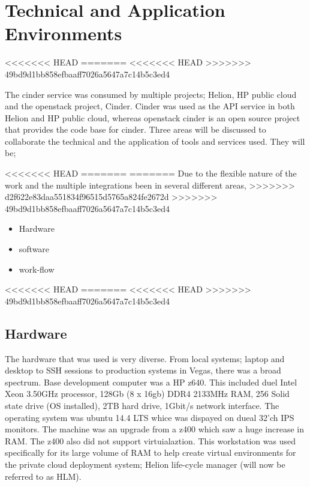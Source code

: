 \documentclass[11pt,a4paper]{report}
\begin{document}
\section{Technical and Application Environments}
<<<<<<< HEAD
=======
<<<<<<< HEAD
>>>>>>> 49bd9d1bb858efbaaff7026a5647a7c14b5c3ed4


The cinder service was consumed by multiple projects; Helion, HP public cloud and the openstack project, Cinder. Cinder was used as the API service in both Helion and HP public cloud, whereas openstack cinder is an open source project that provides the code base for cinder. Three areas will be discussed to collaborate the technical and the application of tools and services used. They will be;

<<<<<<< HEAD
=======
=======
Due to the flexible nature of the work and the multiple integrations  been in several different areas, 
>>>>>>> d2f622e83daa551834f96515d5765a824fe2672d
>>>>>>> 49bd9d1bb858efbaaff7026a5647a7c14b5c3ed4
\begin{itemize}
\item Hardware
\item software
\item work-flow
\end{itemize} 

<<<<<<< HEAD
=======
<<<<<<< HEAD
>>>>>>> 49bd9d1bb858efbaaff7026a5647a7c14b5c3ed4
\subsection{Hardware}
The hardware that was used is very diverse. From local systems; laptop and desktop to SSH sessions to production systems in Vegas, there was a broad spectrum.
Base development computer was a HP z640. This included duel Intel Xeon 3.50GHz processor, 128Gb (8 x 16gb) DDR4 2133MHz RAM, 256 Solid state drive (OS installed), 2TB hard drive, 1Gbit/s network interface. The operating system was ubuntu 14.4 LTS whice was dispayed on dueal 32'ch IPS monitors. The machine was an upgrade from a z400 which saw a huge increase in RAM. The z400 also did not support virtuialaztion. This workstation was used specifically for its large volume of RAM to help create virtual environments for the private cloud deployment system; Helion life-cycle manager (will now be referred to as HLM).
\end{document}

